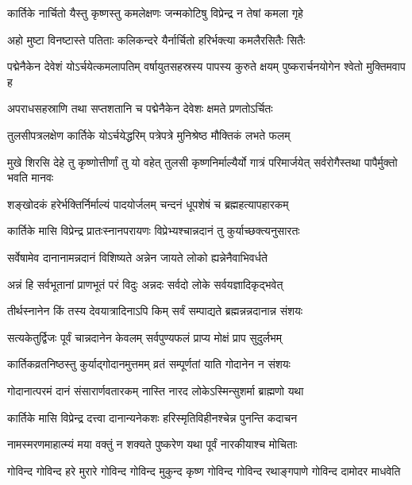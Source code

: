 \twolineshloka
{कार्तिके नार्चितो यैस्तु कृष्णस्तु कमलेक्षणः}
{जन्मकोटिषु विप्रेन्द्र न तेषां कमला गृहे} %

\twolineshloka
{अहो मुष्टा विनष्टास्ते पतिताः कलिकन्दरे}
{यैर्नार्चितो हरिर्भक्त्या कमलैरसितैः सितैः} %

\threelineshloka
{पद्मेनैकेन देवेशं योऽर्चयेत्कमलापतिम्}
{वर्षायुतसहस्रस्य पापस्य कुरुते क्षयम्}
{पुष्करार्चनयोगेन श्वेतो मुक्तिमवाप ह} %

\twolineshloka
{अपराधसहस्राणि तथा सप्तशतानि च}
{पद्मेनैकेन देवेशः क्षमते प्रणतोऽर्चितः} %

\twolineshloka
{तुलसीपत्रलक्षेण कार्तिके योऽर्चयेद्धरिम्}
{पत्रेपत्रे मुनिश्रेष्ठ मौक्तिकं लभते फलम्} %

\threelineshloka
{मुखे शिरसि देहे तु कृष्णोत्तीर्णां तु यो वहेत्}
{तुलसी कृष्णनिर्माल्यैर्यो गात्रं परिमार्जयेत्}
{सर्वरोगैस्तथा पापैर्मुक्तो भवति मानवः} %

\twolineshloka
{शङ्खोदकं हरेर्भक्तिर्निर्माल्यं पादयोर्जलम्}
{चन्दनं धूपशेषं च ब्रह्महत्यापहारकम्} %

\twolineshloka
{कार्तिके मासि विप्रेन्द्र प्रातःस्नानपरायणः}
{विप्रेभ्यश्चान्नदानं तु कुर्याच्छक्त्यनुसारतः} %

\twolineshloka
{सर्वेषामेव दानानामन्नदानं विशिष्यते}
{अन्नेन जायते लोको ह्यन्नेनैवाभिवर्धते} %

\twolineshloka
{अन्नं हि सर्वभूतानां प्राणभूतं परं विदुः}
{अन्नदः सर्वदो लोके सर्वयज्ञादिकृद्भवेत्} %

\twolineshloka
{तीर्थस्नानेन किं तस्य देवयात्रादिनाऽपि किम्}
{सर्वं सम्पाद्यते ब्रह्मन्नन्नदानान्न संशयः} %

\twolineshloka
{सत्यकेतुर्द्विजः पूर्वं चान्नदानेन केवलम्}
{सर्वपुण्यफलं प्राप्य मोक्षं प्राप सुदुर्लभम्} %

\twolineshloka
{कार्तिकव्रतनिष्ठस्तु कुर्याद्गोदानमुत्तमम्}
{व्रतं सम्पूर्णतां याति गोदानेन न संशयः} %

\twolineshloka
{गोदानात्परमं दानं संसारार्णवतारकम्}
{नास्ति नारद लोकेऽस्मिन्सुशर्मा ब्राह्मणो यथा} %

\twolineshloka
{कार्तिके मासि विप्रेन्द्र दत्त्वा दानान्यनेकशः}
{हरिस्मृतिविहीनश्चेन्न पुनन्ति कदाचन} %

\twolineshloka
{नामस्मरणमाहात्म्यं मया वक्तुं न शक्यते}
{पुष्करेण यथा पूर्वं नारकीयाश्च मोचिताः} %

\fourlineindentedshloka
{गोविन्द गोविन्द हरे मुरारे}
{गोविन्द गोविन्द मुकुन्द कृष्ण}
{गोविन्द गोविन्द रथाङ्गपाणे}
{गोविन्द दामोदर माधवेति} %


